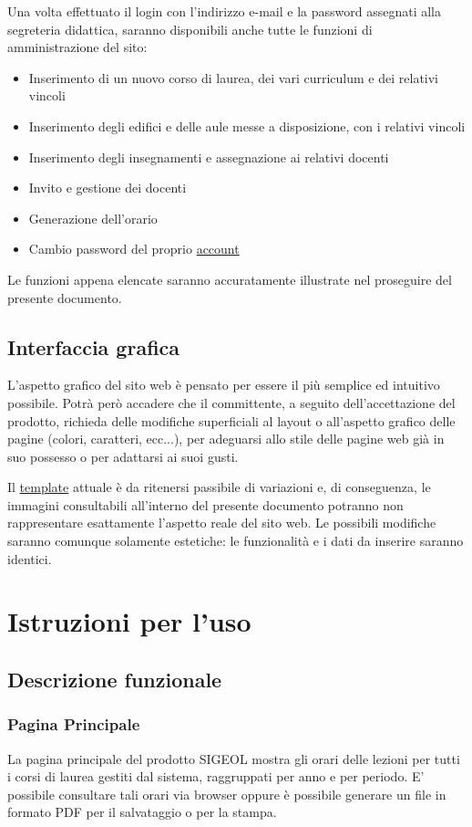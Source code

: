 \documentclass[11pt,a4paper]{article}
\begin{document}
\bigskip
Una volta effettuato il login con l'indirizzo e-mail e la password assegnati alla segreteria didattica, saranno disponibili anche tutte le funzioni di amministrazione del sito:
\begin{itemize}
 \item Inserimento di un nuovo corso di laurea, dei vari curriculum e dei relativi vincoli
 \item Inserimento degli edifici e delle aule messe a disposizione, con i relativi vincoli
 \item Inserimento degli insegnamenti e assegnazione ai relativi docenti
 \item Invito e gestione dei docenti
 \item Generazione dell'orario
 \item Cambio password del proprio \underline{account}
\end{itemize}
Le funzioni appena elencate saranno accuratamente illustrate nel proseguire del presente documento.
\subsection{Interfaccia grafica}
L'aspetto grafico del sito web è pensato per essere il più semplice ed intuitivo possibile. Potrà però accadere che il committente, a seguito dell'accettazione del prodotto, richieda delle modifiche superficiali al layout o all'aspetto grafico delle pagine (colori, caratteri, ecc...), per adeguarsi allo stile delle pagine web già in suo possesso o per adattarsi ai suoi gusti.

Il \underline{template} attuale è da ritenersi passibile di variazioni e, di conseguenza, le immagini consultabili all'interno del presente documento potranno non rappresentare esattamente l'aspetto reale del sito web. Le possibili modifiche saranno comunque solamente estetiche: le funzionalità e i dati da inserire saranno identici.
\section{Istruzioni per l'uso}
\subsection{Descrizione funzionale}
\subsubsection{Pagina Principale}
La pagina principale del prodotto SIGEOL mostra gli orari delle lezioni per tutti i corsi di laurea gestiti dal sistema, raggruppati per anno e per periodo. E' possibile consultare tali orari via browser oppure è possibile generare un file in formato PDF per il salvataggio o per la stampa.
\end{document}
